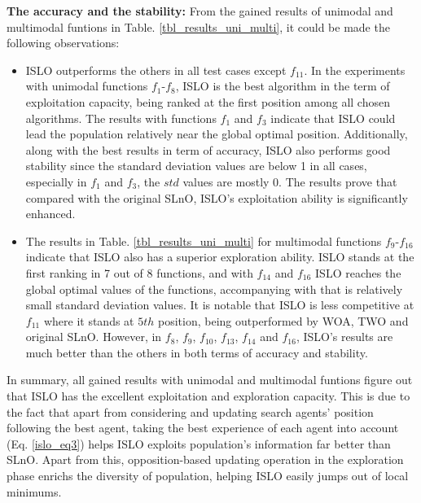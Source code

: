 \documentclass[a4paper,13pt,2p]{report}
\begin{document}
	\textbf{The accuracy and the stability:} From the gained results of unimodal and multimodal funtions in Table. \ref{tbl_results_uni_multi}, it could be made the following observations:
\begin{itemize}
\item ISLO outperforms the others in all test cases except $f_{11}$. In the experiments with unimodal functions $f_1$-$f_8$, ISLO is the best algorithm in the term of exploitation capacity, being ranked at the first position among all chosen algorithms. The results with functions $f_1$ and $f_3$ indicate that ISLO could lead the population relatively near the global optimal position. Additionally, along with the best results in term of accuracy, ISLO also performs good stability since the standard deviation values are below 1 in all cases, especially in $f_1$ and $f_3$, the $std$ values are mostly 0. The results prove that compared with the original SLnO, ISLO's exploitation ability is significantly enhanced. 
\item The results in Table. \ref{tbl_results_uni_multi} for multimodal functions $f_9$-$f_{16}$ indicate that ISLO also has a superior exploration ability. ISLO stands at the first ranking in 7 out of 8 functions, and with $f_{14}$ and $f_{16}$ ISLO reaches the global optimal values of the functions, accompanying with that is relatively small standard deviation values. It is notable that ISLO is less competitive at $f_{11}$ where it stands at $5th$ position, being outperformed by WOA, TWO and original SLnO. However, in $f_8$, $f_9$, $f_{10}$, $f_{13}$, $f_{14}$ and $f_{16}$, ISLO's results are much better than the others in both terms of accuracy and stability.
\end{itemize}
In summary, all gained results with unimodal and multimodal funtions figure out that ISLO has the excellent exploitation and exploration capacity. This is due to the fact that apart from considering and updating search agents' position following the best agent, taking the best experience of each agent into account (Eq. \ref{islo_eq3}) helps ISLO exploits population's information far better than SLnO. Apart from this, opposition-based updating operation in the exploration phase enrichs the diversity of population, helping ISLO easily jumps out of local minimums.
\end{document}
